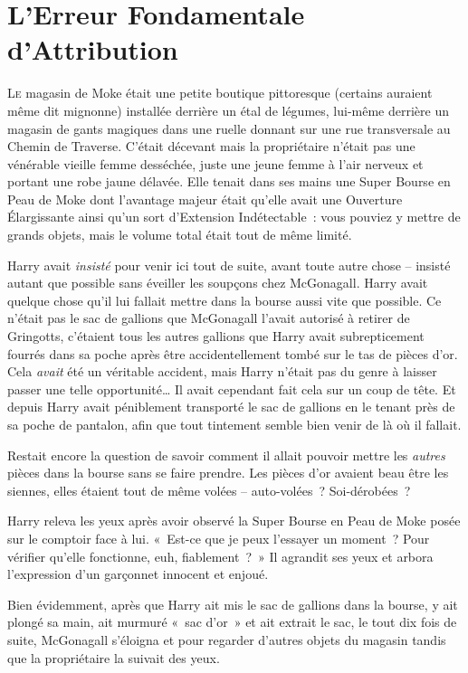 \chapter{L'Erreur Fondamentale d'Attribution}

\lettrine{L}{e} magasin de Moke était une petite boutique pittoresque (certains auraient même dit mignonne) installée derrière un étal de légumes, lui-même derrière un magasin de gants magiques dans une ruelle donnant sur une rue transversale au Chemin de Traverse. C'était décevant mais la propriétaire n'était pas une vénérable vieille femme desséchée, juste une jeune femme à l'air nerveux et portant une robe jaune délavée. Elle tenait dans ses mains une Super Bourse en Peau de Moke  dont l'avantage majeur était qu'elle avait une Ouverture Élargissante ainsi qu'un sort d'Extension Indétectable~: vous pouviez y mettre de grands objets, mais le volume total était tout de même limité.

Harry avait \emph{insisté} pour venir ici tout de suite, avant toute autre chose -- insisté autant que possible sans éveiller les soupçons chez McGonagall. Harry avait quelque chose qu'il lui fallait mettre dans la bourse aussi vite que possible. Ce n'était pas le sac de gallions que McGonagall l'avait autorisé à retirer de Gringotts, c'étaient tous les autres gallions que Harry avait subrepticement fourrés dans sa poche après être accidentellement tombé sur le tas de pièces d'or. Cela \emph{avait} été un véritable accident, mais Harry n'était pas du genre à laisser passer une telle opportunité… Il avait cependant fait cela sur un coup de tête. Et depuis Harry avait péniblement transporté le sac de gallions en le tenant près de sa poche de pantalon, afin que tout tintement semble bien venir de là où il fallait.

Restait encore la question de savoir comment il allait pouvoir mettre les \emph{autres} pièces dans la bourse sans se faire prendre. Les pièces d'or avaient beau être les siennes, elles étaient tout de même volées -- auto-volées~? Soi-dérobées~?

Harry releva les yeux après avoir observé la Super Bourse en Peau de Moke  posée sur le comptoir face à lui. «~Est-ce que je peux l'essayer un moment~? Pour vérifier qu'elle fonctionne, euh, fiablement~?~» Il agrandit ses yeux et arbora l'expression d'un garçonnet innocent et enjoué.

Bien évidemment, après que Harry ait mis le sac de gallions dans la bourse, y ait plongé sa main, ait murmuré «~sac d'or~» et ait extrait le sac, le tout dix fois de suite, McGonagall s'éloigna et pour regarder d'autres objets du magasin tandis que la propriétaire la suivait des yeux.

